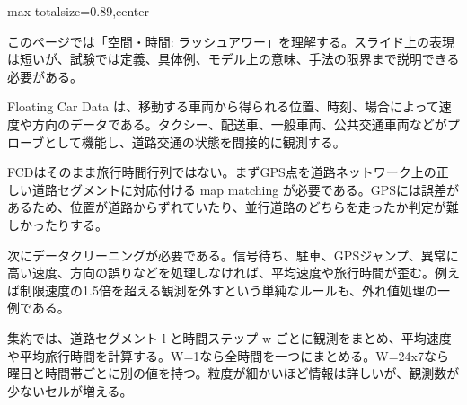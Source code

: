 \begin{minipage}[t]{0.58\textwidth}
\begin{adjustbox}{max totalsize={\textwidth}{0.89\textheight},center}
\begin{minipage}{\textwidth}\scriptsize
{}このページでは「空間・時間: ラッシュアワー」を理解する。スライド上の表現は短いが、試験では定義、具体例、モデル上の意味、手法の限界まで説明できる必要がある。\par
Floating Car Data は、移動する車両から得られる位置、時刻、場合によって速度や方向のデータである。タクシー、配送車、一般車両、公共交通車両などがプローブとして機能し、道路交通の状態を間接的に観測する。\par
FCDはそのまま旅行時間行列ではない。まずGPS点を道路ネットワーク上の正しい道路セグメントに対応付ける map matching が必要である。GPSには誤差があるため、位置が道路からずれていたり、並行道路のどちらを走ったか判定が難しかったりする。\par
次にデータクリーニングが必要である。信号待ち、駐車、GPSジャンプ、異常に高い速度、方向の誤りなどを処理しなければ、平均速度や旅行時間が歪む。例えば制限速度の1.5倍を超える観測を外すという単純なルールも、外れ値処理の一例である。\par
集約では、道路セグメント l と時間ステップ w ごとに観測をまとめ、平均速度や平均旅行時間を計算する。W=1なら全時間を一つにまとめる。W=24x7なら曜日と時間帯ごとに別の値を持つ。粒度が細かいほど情報は詳しいが、観測数が少ないセルが増える。\par

\end{minipage}
\end{adjustbox}
\end{minipage}
